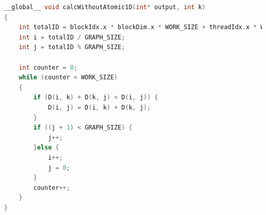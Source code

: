 \documentclass[conference]{IEEEtran}
\begin{document}
\begin{lstlisting}[language=C++, caption=Parallel GPU]
__global__ void calcWithoutAtomic1D(int* output, int k)
{
	int totalID = blockIdx.x * blockDim.x * WORK_SIZE + threadIdx.x * WORK_SIZE;
	int i = totalID / GRAPH_SIZE;
	int j = totalID % GRAPH_SIZE;

	int counter = 0;
	while (counter < WORK_SIZE)
	{
		if (D(i, k) + D(k, j) < D(i, j)) {
			D(i, j) = D(i, k) + D(k, j);
		}
		if ((j + 1) < GRAPH_SIZE) {
			j++;
		}else {
			i++;
			j = 0;
		}
		counter++;
	}
}
\end{lstlisting}
\end{document}
